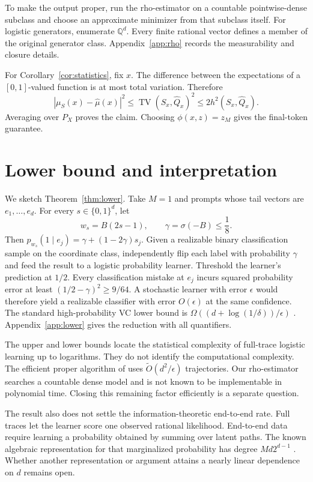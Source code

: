 \documentclass{article}
\theoremstyle{definition}
\theoremstyle{remark}
\newcommand{\TV}{\operatorname{TV}}
\begin{document}
To make the output proper, run the rho-estimator on a countable pointwise-dense subclass and choose an approximate minimizer from that subclass itself. For logistic generators, enumerate $\mathbb Q^d$. Every finite rational vector defines a member of the original generator class. Appendix~\ref{app:rho} records the measurability and closure details.

For Corollary~\ref{cor:statistics}, fix $x$. The difference between the expectations of a $[0,1]$-valued function is at most total variation. Therefore \[ |\mu_S(x)-\widehat\mu(x)|^2 \le\TV(S_x,\widehat Q_x)^2 \le2h^2(S_x,\widehat Q_x). \] Averaging over $P_X$ proves the claim. Choosing $\phi(x,z)=z_M$ gives the final-token guarantee.

\section{Lower bound and interpretation}
\label{sec:lower}

We sketch Theorem~\ref{thm:lower}. Take $M=1$ and prompts whose tail vectors are $e_1,\ldots,e_d$. For every $s\in\{0,1\}^d$, let \[ w_s=B(2s-1),\qquad \gamma=\sigma(-B)\le\frac18. \] Then $p_{w_s}(1\mid e_j)=\gamma+(1-2\gamma)s_j$. Given a realizable binary classification sample on the coordinate class, independently flip each label with probability $\gamma$ and feed the result to a logistic probability learner. Threshold the learner's prediction at $1/2$. Every classification mistake at $e_j$ incurs squared probability error at least $(1/2-\gamma)^2\ge9/64$. A stochastic learner with error $\epsilon$ would therefore yield a realizable classifier with error $O(\epsilon)$ at the same confidence. The standard high-probability VC lower bound is $\Omega((d+\log(1/\delta))/\epsilon)$ \citep{shalev2014understanding}. Appendix~\ref{app:lower} gives the reduction with all quantifiers.

The upper and lower bounds locate the statistical complexity of full-trace logistic learning up to logarithms. They do not identify the computational complexity. The efficient proper algorithm of \citet{doronarad2026stochastic} uses $\widetilde O(d^2/\epsilon)$ trajectories. Our rho-estimator searches a countable dense model and is not known to be implementable in polynomial time. Closing this remaining factor efficiently is a separate question.

The result also does not settle the information-theoretic end-to-end rate. Full traces let the learner score one observed rational likelihood. End-to-end data require learning a probability obtained by summing over latent paths. The known algebraic representation for that marginalized probability has degree $Md2^{d-1}$ \citep{doronarad2026stochastic}. Whether another representation or argument attains a nearly linear dependence on $d$ remains open.
\end{document}
